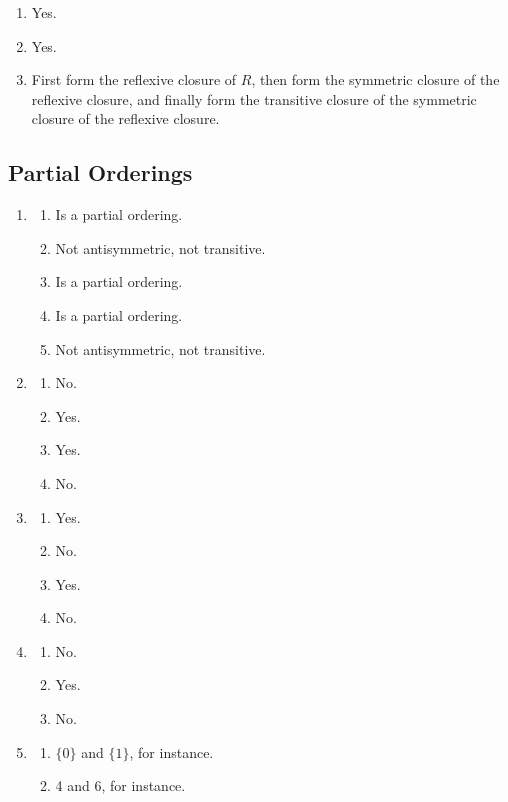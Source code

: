 \documentclass{sig-alternate-05-2015}
\begin{document}
\begin{enumerate}
\item Yes.

\item Yes.

\item First form the reflexive closure of $R$, then form
the symmetric closure of the reflexive closure, and finally
form the transitive closure of the symmetric closure of the
reflexive closure.
\end{enumerate}

\subsection{Partial Orderings}
\begin{enumerate}
\item 
\begin{enumerate}
	\item Is a partial ordering.
	\item Not antisymmetric, not transitive.
	\item Is a partial ordering.
	\item Is a partial ordering.
	\item Not antisymmetric, not transitive.
\end{enumerate}

\item 
\begin{enumerate}
	\item No.
	\item Yes.
	\item Yes.
	\item No.
\end{enumerate}

\item 
\begin{enumerate}
	\item Yes.
	\item No.
	\item Yes.
	\item No.
\end{enumerate}

\item 
\begin{enumerate}
	\item No.
	\item Yes.
	\item No.
\end{enumerate}

\item 
\begin{enumerate}
	\item $\{0\}$ and $\{1\}$, for instance.
	\item 4 and 6, for instance.
\end{enumerate}


\end{enumerate}
\end{document}

